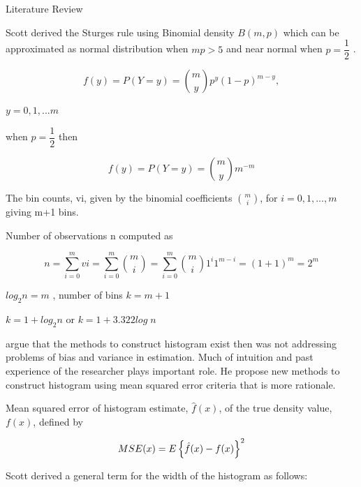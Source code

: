 \documentclass{beamer}
\begin{document}
\begin{frame}[allowframebreaks]{Literature Review}
\begin{itemize}
Scott derived the Sturges rule using Binomial density $ B(m,p) $ which can be approximated as normal distribution when $mp > 5$ and near normal when $p=\dfrac{1}{2}$ .

\begin{equation}
f(y)=P(Y=y)={m \choose y} p^{y}(1-p)^{m-y},
\end{equation}

\begin{center}
	$ y= 0,1,...m $
\end{center} 

\begin{center}
	when $p=\dfrac{1}{2}$ then
\end{center} 

\begin{equation}
f(y)=P(Y=y)={m \choose y}m^{-m}
\end{equation}


The bin counts, vi, given by the binomial coefficients ${m \choose i}$, for $i = 0,1, ... ,m$ giving m+1 bins. 

Number of observations n computed as 

\begin{equation}
n = \sum_{i=0}^{m} vi =  \sum_{i=0}^{m} {m \choose i} =  \sum_{i=0}^{m} {m \choose i} 1^{i} 1^{m-i} = (1 + 1)^{m} = 2^m  
\end{equation}

\begin{center}
	$log_2 n = m $ , number of bins $ k= m+ 1$ 
	
\end{center}


\begin{center}
	$ k = 1 + log_2 n $ or $ k = 1 + 3.322 log\;n $ 
\end{center}

\cite[p~605]{SCOTT1979} argue that the methods to construct histogram exist then was not  addressing problems of bias and variance in estimation. Much of intuition and past experience of the researcher plays important role. He propose new methods to construct histogram using mean squared error criteria that is more rationale.

Mean squared error of histogram estimate, $\hat{f}(x)$, of the true density value, $f(x)$, defined by

\begin{equation}
MSE(x)=\large E \left\{\hat{f}(x) - f(x)  \right\}^2
\end{equation}

Scott derived a general term for the width of the histogram as follows:


\end{itemize}
\end{frame}
\end{document}

